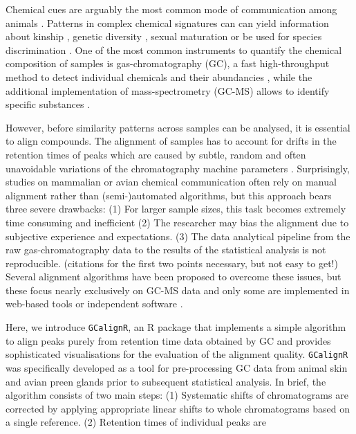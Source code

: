Chemical cues are arguably the most common mode of communication among
animals \citep{Wyatt.2014}. Patterns in complex chemical signatures can
can yield information about kinship \citep{Krause.2012, Stoffel.2015},
genetic diversity \citep{Charpentier.2010, Leclaire.2012}, sexual
maturation \citep{Caspers.2011} or be used for species discrimination
\citep{Meulemeester.2011}. One of the most common instruments to
quantify the chemical composition of samples is gas-chromatography (GC),
a fast high-throughput method to detect individual chemicals and their
abundancies \citep{McNair.2011}, while the additional implementation of
mass-spectrometry (GC-MS) allows to identify specific substances
\citep{Caspers.2011}. \par
However, before similarity patterns across samples can be analysed, it
is essential to align compounds. The alignment of samples has to account
for drifts in the retention times of peaks which are caused by subtle,
random and often unavoidable variations of the chromatography machine
parameters \citep{Pierce.2005}. Surprisingly, studies on mammalian or
avian chemical communication often rely on manual alignment rather than
(semi-)automated algorithms, but this approach bears three severe
drawbacks: (1) For larger sample sizes, this task becomes extremely time
consuming and inefficient (2) The researcher may bias the alignment due
to subjective experience and expectations. (3) The data analytical
pipeline from the raw gas-chromatography data to the results of the
statistical analysis is not reproducible. (citations for the first two
points necessary, but not easy to get!) Several alignment algorithms
have been proposed to overcome these issues, but these focus nearly
exclusively on GC-MS data \citep{Pierce.2005, Robinson.2007,Jiang.2013}
and only some are implemented in web-based tools
\citep{Hoffmann.2009, Wang.2010} or independent software
\citep{Dellicour.2013}. \par
Here, we introduce \texttt{GCalignR}, an R package that implements a
simple algorithm to align peaks purely from retention time data obtained
by GC and provides sophisticated visualisations for the evaluation of
the alignment quality. \texttt{GCalignR} was specifically developed as a
tool for pre-processing GC data from animal skin and avian preen glands
prior to subsequent statistical analysis. In brief, the algorithm
consists of two main steps: (1) Systematic shifts of chromatograms are
corrected by applying appropriate linear shifts to whole chromatograms
based on a single reference. (2) Retention times of individual peaks are
